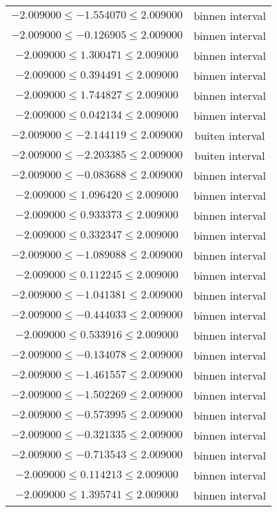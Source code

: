 \documentclass{article}
\begin{document}
\begin{longtabu}{cc}
    $-2.009000 \leq -1.554070 \leq 2.009000$ & binnen interval \\
    $-2.009000 \leq -0.126905 \leq 2.009000$ & binnen interval \\
    $-2.009000 \leq 1.300471 \leq 2.009000$ & binnen interval \\
    $-2.009000 \leq 0.394491 \leq 2.009000$ & binnen interval \\
    $-2.009000 \leq 1.744827 \leq 2.009000$ & binnen interval \\
    $-2.009000 \leq 0.042134 \leq 2.009000$ & binnen interval \\
    $-2.009000 \leq -2.144119 \leq 2.009000$ & buiten interval \\
    $-2.009000 \leq -2.203385 \leq 2.009000$ & buiten interval \\
    $-2.009000 \leq -0.083688 \leq 2.009000$ & binnen interval \\
    $-2.009000 \leq 1.096420 \leq 2.009000$ & binnen interval \\
    $-2.009000 \leq 0.933373 \leq 2.009000$ & binnen interval \\
    $-2.009000 \leq 0.332347 \leq 2.009000$ & binnen interval \\
    $-2.009000 \leq -1.089088 \leq 2.009000$ & binnen interval \\
    $-2.009000 \leq 0.112245 \leq 2.009000$ & binnen interval \\
    $-2.009000 \leq -1.041381 \leq 2.009000$ & binnen interval \\
    $-2.009000 \leq -0.444033 \leq 2.009000$ & binnen interval \\
    $-2.009000 \leq 0.533916 \leq 2.009000$ & binnen interval \\
    $-2.009000 \leq -0.134078 \leq 2.009000$ & binnen interval \\
    $-2.009000 \leq -1.461557 \leq 2.009000$ & binnen interval \\
    $-2.009000 \leq -1.502269 \leq 2.009000$ & binnen interval \\
    $-2.009000 \leq -0.573995 \leq 2.009000$ & binnen interval \\
    $-2.009000 \leq -0.321335 \leq 2.009000$ & binnen interval \\
    $-2.009000 \leq -0.713543 \leq 2.009000$ & binnen interval \\
    $-2.009000 \leq 0.114213 \leq 2.009000$ & binnen interval \\
    $-2.009000 \leq 1.395741 \leq 2.009000$ & binnen interval \\

\end{longtabu}
\end{document}
